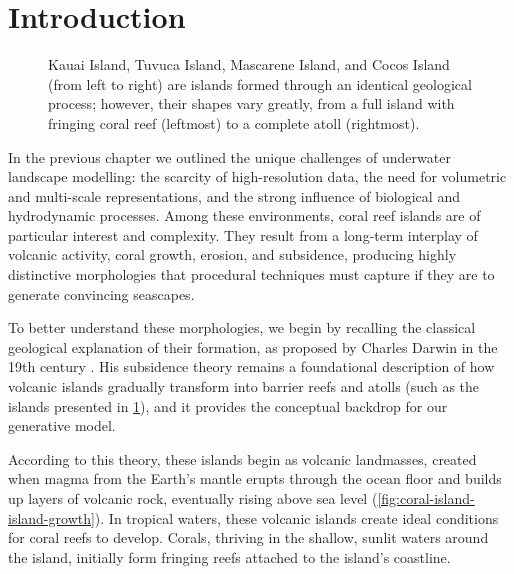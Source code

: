 \minitoc

\section{Introduction}
\label{sec:coral-island-introduction}

\begin{figure}[H]
\caption{Kauai Island, Tuvuca Island, Mascarene Island, and Cocos Island (from left to right) are islands formed through an identical geological process; however, their shapes vary greatly, from a full island with fringing coral reef (leftmost) to a complete atoll (rightmost).}
\label{fig:coral-island-island-examples}
\end{figure}

In the previous chapter we outlined the unique challenges of underwater landscape modelling: the scarcity of high-resolution data, the need for volumetric and multi-scale representations, and the strong influence of biological and hydrodynamic processes. Among these environments, coral reef islands are of particular interest and complexity. They result from a long-term interplay of volcanic activity, coral growth, erosion, and subsidence, producing highly distinctive morphologies that procedural techniques must capture if they are to generate convincing seascapes.

To better understand these morphologies, we begin by recalling the classical geological explanation of their formation, as proposed by Charles Darwin in the 19th century \cite{Darwin1842}. His subsidence theory remains a foundational description of how volcanic islands gradually transform into barrier reefs and atolls (such as the islands presented in \cref{fig:coral-island-island-examples}), and it provides the conceptual backdrop for our generative model.

According to this theory, these islands begin as volcanic landmasses, created when magma from the Earth's mantle erupts through the ocean floor and builds up layers of volcanic rock, eventually rising above sea level (\cref{fig:coral-island-island-growth}). In tropical waters, these volcanic islands create ideal conditions for coral reefs to develop. Corals, thriving in the shallow, sunlit waters around the island, initially form fringing reefs attached to the island's coastline.

